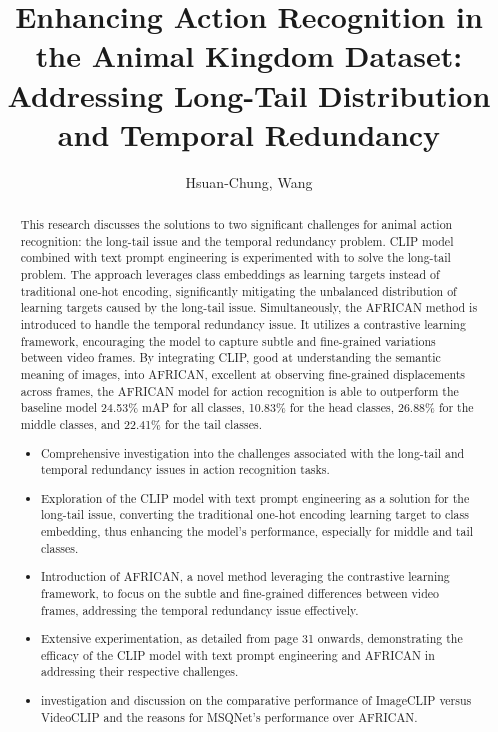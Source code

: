 \documentclass[
]{uob-thesis}
\title{Enhancing Action Recognition in the Animal Kingdom Dataset: Addressing Long-Tail Distribution and Temporal Redundancy}
\author{Hsuan-Chung, Wang}
\date{\printdatewithoutmonth{thesisdate}}
\begin{document}

\maketitle
\cleardoubleoddemptypage

\begin{abstract} %

This research discusses the solutions to two significant challenges for animal action recognition: the long-tail issue and the temporal redundancy problem. CLIP model combined with text prompt engineering is experimented with to solve the long-tail problem. The approach leverages class embeddings as learning targets instead of traditional one-hot encoding, significantly mitigating the unbalanced distribution of learning targets caused by the long-tail issue. Simultaneously, the AFRICAN method is introduced to handle the temporal redundancy issue. It utilizes a contrastive learning framework, encouraging the model to capture subtle and fine-grained variations between video frames. By integrating CLIP, good at understanding the semantic meaning of images, into AFRICAN, excellent at observing fine-grained displacements across frames, the AFRICAN model for action recognition is able to outperform the baseline model 24.53\% mAP for all classes, 10.83\% for the head classes, 26.88\% for the middle classes, and 22.41\% for the tail classes.

\begin{itemize}
    \item Comprehensive investigation into the challenges associated with the long-tail and temporal redundancy issues in action recognition tasks.
    \item Exploration of the CLIP model with text prompt engineering as a solution for the long-tail issue, converting the traditional one-hot encoding learning target to class embedding, thus enhancing the model's performance, especially for middle and tail classes.
    \item Introduction of AFRICAN, a novel method leveraging the contrastive learning framework, to focus on the subtle and fine-grained differences between video frames, addressing the temporal redundancy issue effectively.
    \item Extensive experimentation, as detailed from page 31 onwards, demonstrating the efficacy of the CLIP model with text prompt engineering and AFRICAN in addressing their respective challenges.
    \item investigation and discussion on the comparative performance of ImageCLIP versus VideoCLIP and the reasons for MSQNet's performance over AFRICAN.
\end{itemize}
\end{abstract}
\end{document}
